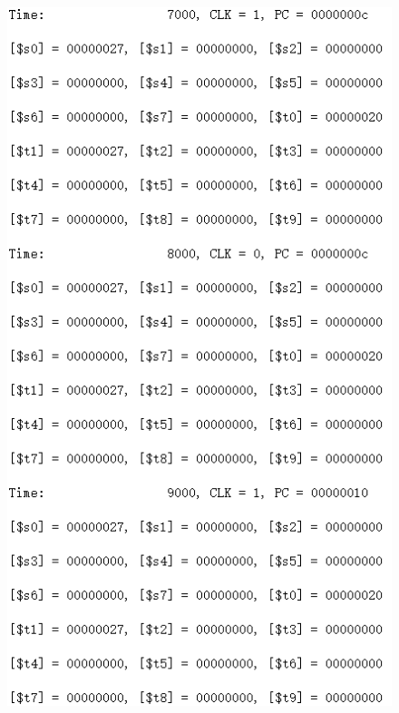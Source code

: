 \documentclass[12pt]{article}
\begin{document}
\begin{figure}[H]
\centering
\includegraphics[scale=1]{R3.jpg}
\end{figure}
\end{document}
